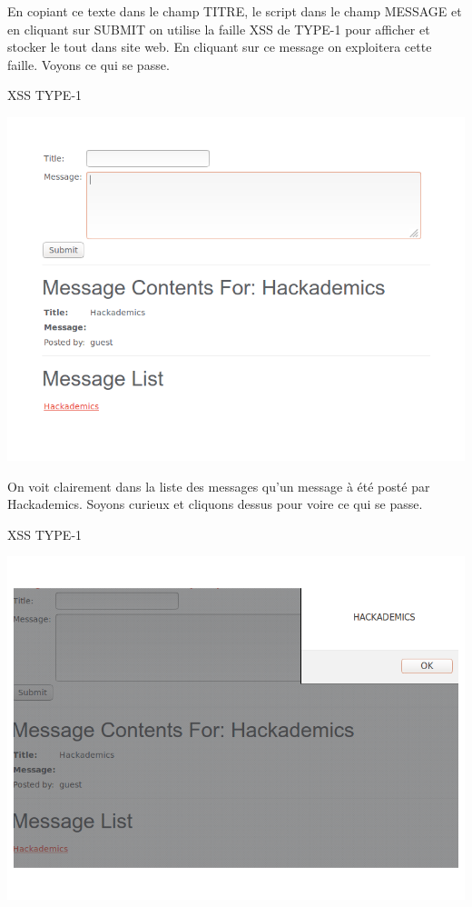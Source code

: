 \begin{flushleft}
En copiant ce texte dans le champ TITRE, le script dans le champ MESSAGE et  en cliquant sur SUBMIT on utilise la faille XSS de TYPE-1 pour afficher et stocker le tout dans site web. En cliquant sur ce message on exploitera cette faille. Voyons ce qui se passe.
\end{flushleft}


\begin{center}
\caption{XSS TYPE-1}
\includegraphics[scale=0.3]{Web/assets/xsst1-1.png}
\end{center}

\bigskip

\begin{flushleft}
On voit clairement dans la liste des messages qu'un message à été posté par Hackademics. Soyons curieux et cliquons dessus pour voire ce qui se passe.
\end{flushleft}

\begin{center}
\caption{XSS TYPE-1}
\includegraphics[scale=0.3]{Web/assets/xsst1-2.png}
\end{center}

